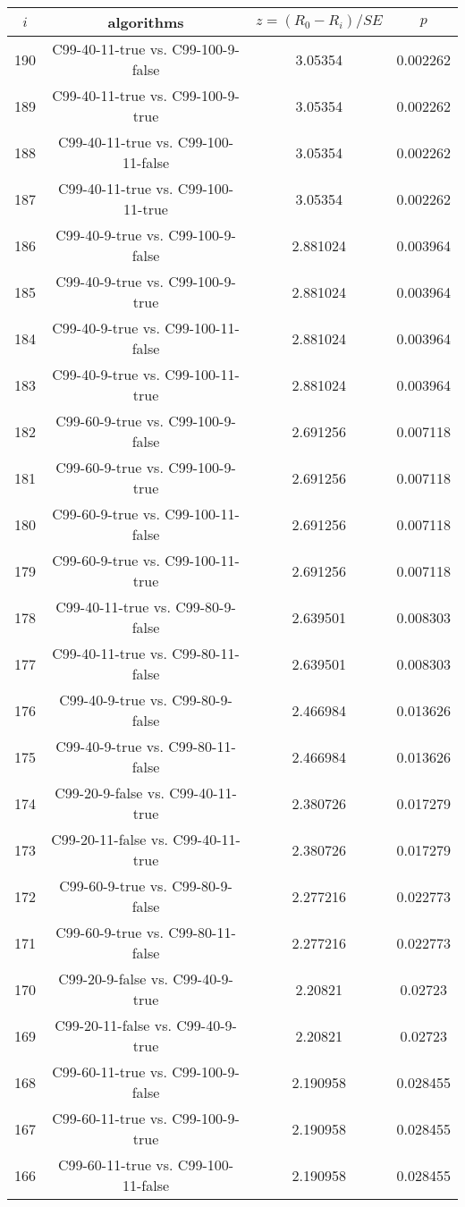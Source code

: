 \documentclass[a4paper,10pt]{article}
\begin{document}
\begin{landscape}
\begin{table}[!htp]
\centering\scriptsize
\begin{tabular}{cccc}
$i$&algorithms&$z=(R_0 - R_i)/SE$&$p$\\
\hline190&C99-40-11-true vs. C99-100-9-false&3.05354&0.002262\\
189&C99-40-11-true vs. C99-100-9-true&3.05354&0.002262\\
188&C99-40-11-true vs. C99-100-11-false&3.05354&0.002262\\
187&C99-40-11-true vs. C99-100-11-true&3.05354&0.002262\\
186&C99-40-9-true vs. C99-100-9-false&2.881024&0.003964\\
185&C99-40-9-true vs. C99-100-9-true&2.881024&0.003964\\
184&C99-40-9-true vs. C99-100-11-false&2.881024&0.003964\\
183&C99-40-9-true vs. C99-100-11-true&2.881024&0.003964\\
182&C99-60-9-true vs. C99-100-9-false&2.691256&0.007118\\
181&C99-60-9-true vs. C99-100-9-true&2.691256&0.007118\\
180&C99-60-9-true vs. C99-100-11-false&2.691256&0.007118\\
179&C99-60-9-true vs. C99-100-11-true&2.691256&0.007118\\
178&C99-40-11-true vs. C99-80-9-false&2.639501&0.008303\\
177&C99-40-11-true vs. C99-80-11-false&2.639501&0.008303\\
176&C99-40-9-true vs. C99-80-9-false&2.466984&0.013626\\
175&C99-40-9-true vs. C99-80-11-false&2.466984&0.013626\\
174&C99-20-9-false vs. C99-40-11-true&2.380726&0.017279\\
173&C99-20-11-false vs. C99-40-11-true&2.380726&0.017279\\
172&C99-60-9-true vs. C99-80-9-false&2.277216&0.022773\\
171&C99-60-9-true vs. C99-80-11-false&2.277216&0.022773\\
170&C99-20-9-false vs. C99-40-9-true&2.20821&0.02723\\
169&C99-20-11-false vs. C99-40-9-true&2.20821&0.02723\\
168&C99-60-11-true vs. C99-100-9-false&2.190958&0.028455\\
167&C99-60-11-true vs. C99-100-9-true&2.190958&0.028455\\
166&C99-60-11-true vs. C99-100-11-false&2.190958&0.028455\\

\end{tabular}
\end{table}
\end{landscape}
\end{document}
